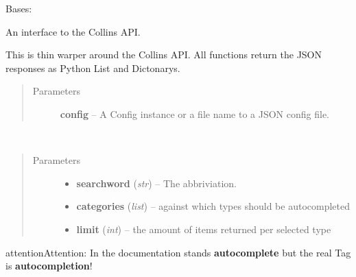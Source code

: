 \documentclass[letterpaper,10pt,english]{sphinxmanual}
\begin{document}
\begin{fulllineitems}
\label{collins:collins.Collins}
Bases: 

An interface to the Collins API.

This is thin warper around the Collins API.
All functions return the JSON responses as Python List and Dictonarys.
\begin{quote}\begin{description}
\item[{Parameters}] \leavevmode
\textbf{config} -- A Config instance or a file name to a JSON config file.

\end{description}\end{quote}

\begin{fulllineitems}
\label{collins:collins.Collins.autocomplete}~\begin{quote}\begin{description}
\item[{Parameters}] \leavevmode\begin{itemize}
\item {} 
\textbf{searchword} (\emph{str}) -- The abbriviation.

\item {} 
\textbf{categories} (\emph{list}) -- against which types should be autocompleted

\item {} 
\textbf{limit} (\emph{int}) -- the amount of items returned per selected type

\end{itemize}

\end{description}\end{quote}

\begin{notice}{attention}{Attention:}
In the documentation stands \textbf{autocomplete} but the real
Tag is \textbf{autocompletion}!
\end{notice}

\end{fulllineitems}



\end{fulllineitems}
\end{document}
